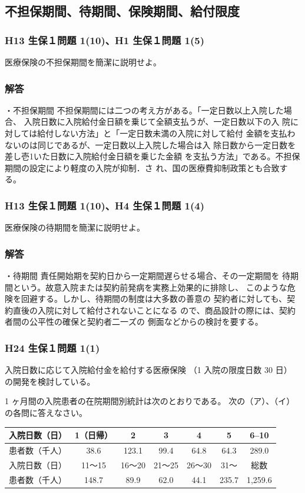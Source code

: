 \documentclass[report,gutter=10mm,fore-edge=10mm,uplatex,dvipdfmx]{jlreq}
\begin{document}
\subsection{不担保期間、待期間、保険期間、給付限度}
\subsubsection{H13 生保１問題 1(10)、H1 生保１問題 1(5)}
医療保険の不担保期間を簡潔に説明せよ。
\subsubsection{解答}
・不担保期間
不担保期間には二つの考え方がある。「一定日数以上入院した場合、
入院日数に入院給付金日額を乗じて全額支払うが、一定日数以下の入
院に対しては給付しない方法」と「一定日数未満の入院に対して給付
金額を支払わないのは同じであるが、一定日数以上入院した場合は入
除日数から一定日数を差し壱1いた日数に入院給付金日額を乗じた金額
を支払う方法」である。不担保期間の設定により軽度の入院が抑制．さ
れ、国の医療費抑制政策とも合致する。
\subsubsection{H13 生保１問題 1(10)、H4 生保１問題 1(4)}
医療保険の待期間を簡潔に説明せよ。
\subsubsection{解答}
・待期間
責任開始期を契約日から一定期間遅らせる場合、その一定期間を
待期間という。故意入院または契約前発病を実務上効果的に排除し、
このような危険を回避する。しかし、待期間の制度は大多数の善意の
契約者に対しても、契約直後の入院に対して給付されないことになる
ので、商品設計の際には、契約者間の公平性の確保と契約者二一ズの
側面などからの検討を要する。
\subsubsection{H24 生保１問題 1(1)}
入院日数に応じて入院給付金を給付する医療保険
（1 入院の限度日数 30 日）
の開発を検討している。

1 ヶ月間の入院患者の在院期間別統計は次のとおりである。
次の（ア）、（イ）の各問に答えなさい。
\begin{tabular}[t]{|c|c|c|c|c|c|c|}
\hline 入院日数（日）& 1（日帰）& 2&3 & 4&5 &6--10 \\
 \hline 患者数（千人） &38.6 &123.1 &99.4 &64.8 &64.3 &289.0 \\ \hline
入院日数（日） & 11～15& 16～20& 21～25& 26～30&31～ & 総数\\ \hline
患者数（千人）
 & 148.7
& 89.9& 62.0& 44.1& 235.7& 1,259.6\\ \hline
\end{tabular}
\end{document}
